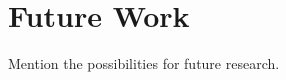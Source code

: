 \chapter{Future Work}
\thispagestyle{fancy}
\label{c:futurework}

Mention the possibilities for future research.
